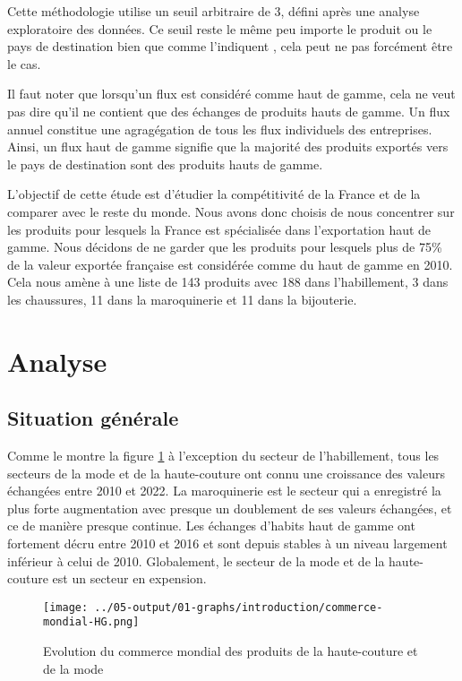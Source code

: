 \documentclass[french,10pt,a4paper]{article}
\begin{document}
Cette méthodologie utilise un seuil arbitraire de 3, défini après une analyse exploratoire des données. Ce seuil reste le même peu importe le produit ou le pays de destination bien que comme l'indiquent \cite{Martin2015}, cela peut ne pas forcément être le cas. 

Il faut noter que lorsqu'un flux est considéré comme haut de gamme, cela ne veut pas dire qu'il ne contient que des échanges de produits hauts de gamme. Un flux annuel constitue une agragégation de tous les flux individuels des entreprises. Ainsi, un flux haut de gamme signifie que la majorité des produits exportés vers le pays de destination sont des produits hauts de gamme.

\medskip

L'objectif de cette étude est d'étudier la compétitivité de la France et de la comparer avec le reste du monde. Nous avons donc choisis de nous concentrer sur les produits pour lesquels la France est spécialisée dans l'exportation haut de gamme. Nous décidons de ne garder que les produits pour lesquels plus de 75\% de la valeur exportée française est considérée comme du haut de gamme en 2010. Cela nous amène à une liste de 143 produits avec 188 dans l'habillement, 3 dans les chaussures, 11 dans la maroquinerie et 11 dans la bijouterie.


\section{Analyse}

\subsection{Situation générale}

Comme le montre la figure \ref{fig:commerce-mondial-HG} à l'exception du secteur de l'habillement, tous les secteurs de la mode et de la haute-couture ont connu une croissance des valeurs échangées entre 2010 et 2022. La maroquinerie est le secteur qui a enregistré la plus forte augmentation avec presque un doublement de ses valeurs échangées, et ce de manière presque continue. Les échanges d'habits haut de gamme ont fortement décru entre 2010 et 2016 et sont depuis stables à un niveau largement inférieur à celui de 2010. Globalement, le secteur de la mode et de la haute-couture est un secteur en expension.

\begin{figure}[!h]
  \centering
  \texttt{[image: ../05-output/01-graphs/introduction/commerce-mondial-HG.png]}
  \caption{Evolution du commerce mondial des produits de la haute-couture et de la mode}
  \label{fig:commerce-mondial-HG}
\end{figure}
\end{document}
